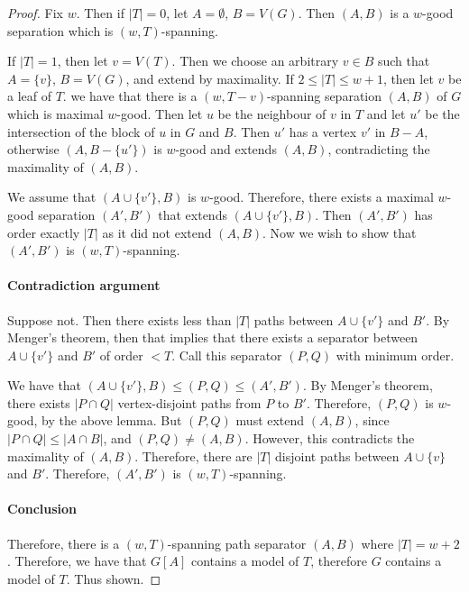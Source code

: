 \documentclass[]{article}
\theoremstyle{definition}
\numberwithin{theorem}{section}
\numberwithin{equation}{section}
\begin{document}
\begin{proof}
	Fix $w$. Then if $|T| = 0$, let $A = \emptyset$, $B = V(G)$. Then $(A, B)$ is a $w$-good separation which is $(w, T)$-spanning.
	
	If $|T| = 1$, then let $v = V(T)$. Then we choose an arbitrary $v \in B$ such that $A = \lbrace v \rbrace$, $B = V(G)$, and extend by maximality. 
	If $2 \leq |T| \leq w + 1$, then let $v$ be a leaf of $T$. we have that there is a  $(w, T - v)$-spanning separation $(A, B)$ of $G$ which is maximal $w$-good. Then let $u$ be the neighbour of $v$ in $T$ and let $u'$ be the intersection of the block of $u$ in $G$ and $B$. Then $u'$ has a vertex $v'$ in $B - A$, otherwise $(A, B - \lbrace u' \rbrace)$ is $w$-good and extends $(A, B)$, contradicting the maximality of $(A, B)$. 
	
	We assume that $(A \cup \lbrace v' \rbrace, B)$ is $w$-good. Therefore, there exists a maximal $w$-good separation $(A', B')$ that extends $(A \cup \lbrace v' \rbrace, B)$. Then $(A', B')$ has order exactly $|T|$ as it did not extend $(A, B)$. Now we wish to show that $(A', B')$ is $(w, T)$-spanning.
	\paragraph{Contradiction argument}
	Suppose not. Then there exists less than $|T|$ paths between $A \cup \lbrace v' \rbrace$ and $B'$. By Menger's theorem, then that implies that there exists a separator between $A \cup \lbrace v' \rbrace$ and $B'$ of order $< T$. Call this separator $(P, Q)$ with minimum order.
	
	We have that $(A \cup \lbrace v' \rbrace, B) \leq (P, Q) \leq (A', B')$. By Menger's theorem, there exists $|P \cap Q|$ vertex-disjoint paths from $P$ to $B'$. Therefore, $(P, Q)$ is $w$-good, by the above lemma. But $(P, Q)$ must extend $(A, B)$, since $|P \cap Q| \leq |A \cap B|$, and $(P, Q) \neq (A, B)$. However, this contradicts the maximality of $(A, B)$.
	Therefore, there are $|T|$ disjoint paths between $A \cup \lbrace v \rbrace$ and $B'$. Therefore, $(A', B')$ is $(w, T)$-spanning.
	
	\paragraph{Conclusion}
	Therefore, there is a $(w, T)$-spanning path separator $(A, B)$ where $|T| = w + 2$. Therefore, we have that $G[A]$ contains a model of $T$, therefore $G$ contains a model of $T$. Thus shown. 
\end{proof}
\end{document}
